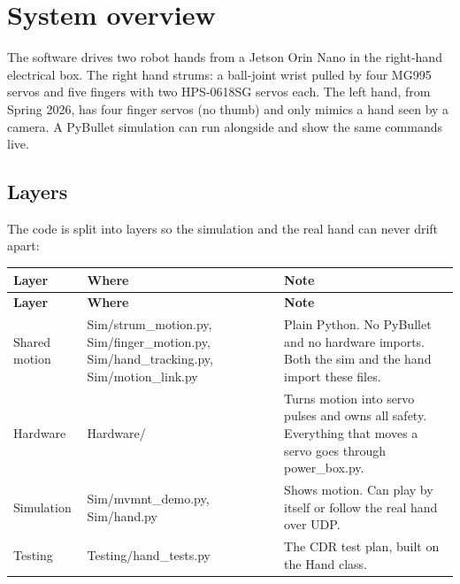 \documentclass[11pt,letterpaper]{article}
\newcommand{\code}[1]{\textcolor{codeblue}{\ttfamily\smaller\relax #1}}
\begin{document}
\section{System overview}
The software drives two robot hands from a Jetson Orin Nano in the right-hand electrical box. The right hand strums: a ball-joint wrist pulled by four MG995 servos and five fingers with two HPS-0618SG servos each. The left hand, from Spring 2026, has four finger servos (no thumb) and only mimics a hand seen by a camera. A PyBullet simulation can run alongside and show the same commands live.


\subsection{Layers}
The code is split into layers so the simulation and the real hand can never drift apart:

{\small
\begin{longtable}{|>{\raggedright\arraybackslash}p{}|>{\raggedright\arraybackslash}p{}|>{\raggedright\arraybackslash}p{}|}
\hline
\rowcolor{tblhead}\textbf{Layer} & \textbf{Where} & \textbf{Note} \\ \hline
\endfirsthead
\hline
\rowcolor{tblhead}\textbf{Layer} & \textbf{Where} & \textbf{Note} \\ \hline
\endhead
Shared motion & \code{Sim/\allowbreak{}strum\_\allowbreak{}motion.py}, \code{Sim/\allowbreak{}finger\_\allowbreak{}motion.py}, \code{Sim/\allowbreak{}hand\_\allowbreak{}tracking.py}, \code{Sim/\allowbreak{}motion\_\allowbreak{}link.py} & Plain Python. No PyBullet and no hardware imports. Both the sim and the hand import these files. \\ \hline
Hardware & \code{Hardware/\allowbreak{}} & Turns motion into servo pulses and owns all safety. Everything that moves a servo goes through \code{power\_\allowbreak{}box.py}. \\ \hline
Simulation & \code{Sim/\allowbreak{}mvmnt\_\allowbreak{}demo.py}, \code{Sim/\allowbreak{}hand.py} & Shows motion. Can play by itself or follow the real hand over UDP. \\ \hline
Testing & \code{Testing/\allowbreak{}hand\_\allowbreak{}tests.py} & The CDR test plan, built on the \code{Hand} class. \\ \hline
\end{longtable}}
\end{document}
